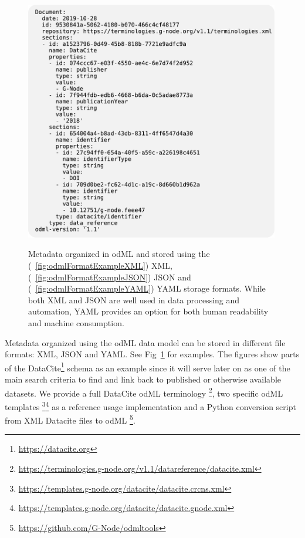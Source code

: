 \documentclass{article}
\begin{document}
\begin{figure}
\begin{minipage}[b]{.3\linewidth}
     \label{fig:odmlFormatExampleJSON}
   \end{minipage}
   \begin{minipage}[b]{.3\linewidth}
     \centering
     \includegraphics[width=0.99\textwidth]{figures/figFormatExampleC.pdf}
     \label{fig:odmlFormatExampleYAML}
   \end{minipage}
   \caption{Metadata organized in odML and stored using the (~\ref{fig:odmlFormatExampleXML}) XML, (~\ref{fig:odmlFormatExampleJSON}) JSON and (~\ref{fig:odmlFormatExampleYAML}) YAML storage formats. While both XML and JSON are well used in data processing and automation, YAML provides an option for both human readability and machine consumption.}
   \label{fig:odmlFormatExample}
\end{figure}

Metadata organized using the odML data model can be stored in different file formats: XML, JSON and YAML. See Fig~\ref{fig:odmlFormatExample} for examples. The figures show parts of the DataCite\footnote{\url{https://datacite.org}} schema as an example since it will serve later on as one of the main search criteria to find and link back to published or otherwise available datasets. We provide a full DataCite odML terminology
\footnote{\url{https://terminologies.g-node.org/v1.1/datareference/datacite.xml}}, two specific odML templates \footnote{\url{https://templates.g-node.org/datacite/datacite.crcns.xml}}\footnote{\url{https://templates.g-node.org/datacite/datacite.gnode.xml}} as a reference usage implementation and a Python conversion script from XML Datacite files to odML \footnote{\url{https://github.com/G-Node/odmltools}}.
\end{document}
